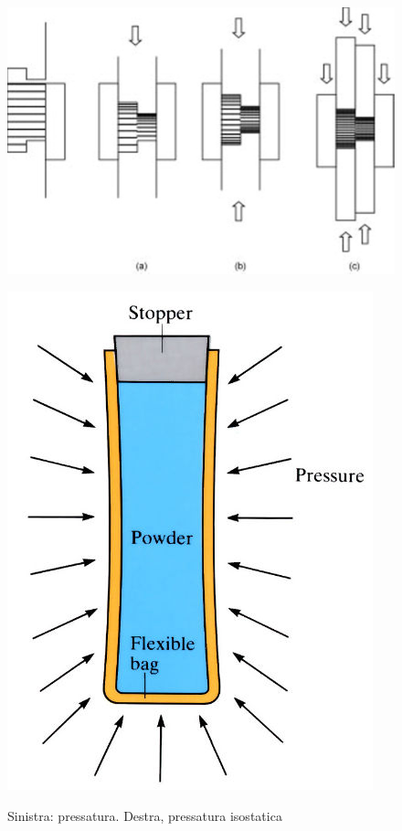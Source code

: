 \begin{figure}[h]
  \begin{minipage}[b]{0.5\linewidth}
    \centering
    \includegraphics[width=\linewidth]{pressing.jpg}
    \label{pres}
  \end{minipage}
  \begin{minipage}[b]{0.5\linewidth}
    \centering
    \includegraphics[width=\linewidth]{iso_pressing.jpg}
    \label{iso-pres}  

  \end{minipage}
  \caption{Sinistra: pressatura. Destra, pressatura isostatica}
\end{figure}

